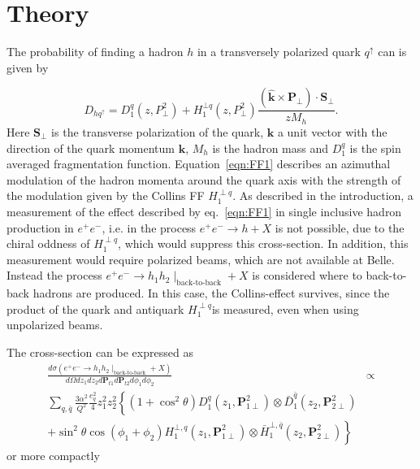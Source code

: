 \documentclass[aps,prX,preprint,groupedaddress,linenumbers]{revtex4-1}
\newcommand{\CFF}{$H_1^{\perp q}$}
\begin{document}
\section{Theory}
\label{sec:theory}
The probability of finding a hadron $h$ in a transversely polarized quark $q^\uparrow$ can is given by 

\begin{equation}
D_{hq^\uparrow}=D^q_1(z,P^2_{\bot})+H^{\bot q}_1(z,P^2_{\bot})\frac{(\boldsymbol{\hat{k}}\times \boldsymbol{P}_{\bot})\cdot \boldsymbol{S}_{\perp}}{zM_h}.
\label{eqn:FF1}
\end{equation}
Here $\boldsymbol{S}_{\perp}$ is the transverse polarization of the quark, $\boldsymbol{\hat{k}}$ a unit vector with the direction of the quark momentum  $\boldsymbol{k}$, $M_h$ is the hadron mass and $D_1^q$ is the spin averaged fragmentation function. Equation~\eqref{eqn:FF1} describes an azimuthal modulation of the hadron momenta around the quark axis with the strength of the modulation given by the Collins FF \CFF.
As described in the introduction, a measurement of the effect described by eq.~\eqref{eqn:FF1} in single inclusive hadron production in $e^+e^-$, i.e. in the process $e^+e^-\rightarrow h +X$ is not possible, due to the chiral oddness of \CFF, which would suppress this cross-section. In addition, this measurement would require polarized beams, which are not available at Belle. Instead the process $e^+e^-\rightarrow h_1 h_2 \mid_{\text{back-to-back}} +X$ is considered where to back-to-back hadrons are produced. In this case, the Collins-effect survives, since the product of the quark and antiquark \CFF is measured, even when using unpolarized beams. 

The cross-section can be expressed as
\begin{equation}
\begin{aligned}
\frac{d\sigma(e^+e^-\rightarrow h_1 h_2 \mid_{\text{back-to-back}} +X)}{d\Omega dz_1dz_2 d\boldsymbol{P}_{t1} d\boldsymbol{P}_{t2} d\phi_1d\phi_2}&\propto \\
\sum_{q,\bar{q}} \frac{3\alpha^2}{Q^2}\frac{e_q^2}{4}z^2_1z^2_2 \left\{ (1+\cos^2\theta)D_1^{q}(z_1,\boldsymbol{P}^2_{1\perp})\otimes\bar{D}_1^{\bar{q}}(z_2,\boldsymbol{P}^2_{2\perp})\right.\\  \left. +\sin^2\theta\cos(\phi_1+\phi_2)H_1^{\bot,q}(z_1,\boldsymbol{P}^2_{1\perp})\otimes\bar{H}_1^{\bot,\bar{q}}(z_2,\boldsymbol{P}^2_{2\perp})\right\}
\end{aligned}
\label{eqn:cross_subsection_ee}
\end{equation}
or more compactly 
 
\end{document}
